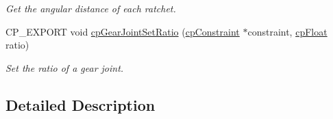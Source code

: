 \begin{DoxyCompactItemize}
\begin{DoxyCompactList}\small\item\em Get the angular distance of each ratchet. \end{DoxyCompactList}\item 
\mbox{\label{group__cp_gear_joint_ga75362fa5be36c30d3006be55b1646b73}} 
C\+P\+\_\+\+E\+X\+P\+O\+RT void \mbox{\hyperlink{group__cp_gear_joint_ga75362fa5be36c30d3006be55b1646b73}{cp\+Gear\+Joint\+Set\+Ratio}} (\mbox{\hyperlink{structcp_constraint}{cp\+Constraint}} $\ast$constraint, \mbox{\hyperlink{group__basic_types_gac1ed65573e035bf892505768c852d8d3}{cp\+Float}} ratio)
\begin{DoxyCompactList}\small\item\em Set the ratio of a gear joint. \end{DoxyCompactList}\end{DoxyCompactItemize}


\subsection{Detailed Description}
